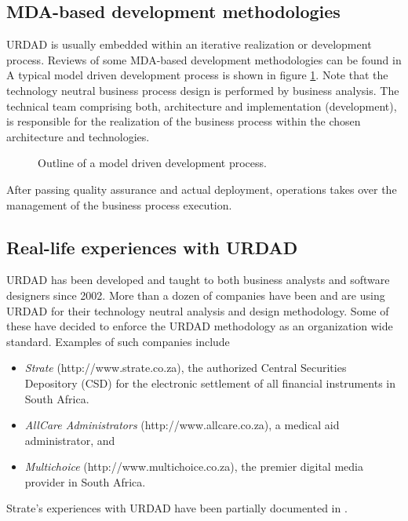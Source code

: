 \subsection{MDA-based development methodologies}

URDAD is usually embedded within an iterative realization or development process. Reviews of some
MDA-based development methodologies can be found in \cite{bercovici:businessArchitectureToSoa}
A typical model driven development process is shown in figure \ref{fig:developmentProcess}. 
Note that the technology neutral business process design is performed by business analysis. 
The technical team comprising both, architecture and implementation (development), 
is responsible for the realization of the business process within the chosen architecture and technologies.

\begin{figure}
  \centering
  \caption{Outline of a model driven development process.}
  \label{fig:developmentProcess}
\end{figure}

After passing quality assurance and actual deployment, operations takes over the management of the
business process execution.


\subsection{Real-life experiences with URDAD}

URDAD has been developed and taught to both business analysts and software designers since 2002.
More than a dozen of companies have been and are using URDAD for their technology neutral analysis
and design methodology. Some of these have decided to enforce the URDAD methodology as an organization
wide standard. Examples of such companies include
\begin{itemize}
  \item {\em Strate} (http://www.strate.co.za), the authorized Central Securities Depository (CSD) for the electronic settlement of all financial instruments in South Africa.
	\item {\em AllCare Administrators} (http://www.allcare.co.za), a medical aid administrator, and
	\item {\em Multichoice} (http://www.multichoice.co.za), the premier digital media provider in South Africa.
\end{itemize}
Strate's experiences with URDAD have been partially documented in \cite{klopper:compareSoftwareMethodologies}.

